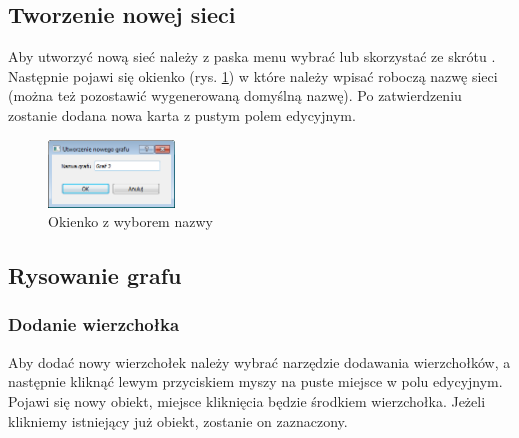 \subsection{Tworzenie nowej sieci}
Aby utworzyć nową sieć należy z paska menu wybrać  lub skorzystać ze skrótu . Następnie pojawi się okienko (rys. \ref{fig:nowyGrafMsgbox}) w które należy wpisać roboczą nazwę sieci (można też pozostawić wygenerowaną domyślną nazwę). Po zatwierdzeniu zostanie dodana nowa karta z pustym polem edycyjnym.
\begin{figure}[H]
	\centering
	\includegraphics[width=0.3\textwidth]{./img/spec_zew02}
	\caption{Okienko z wyborem nazwy}
	\label{fig:nowyGrafMsgbox}
\end{figure}
\subsection{Rysowanie grafu}
\subsubsection{Dodanie wierzchołka}
Aby dodać nowy wierzchołek należy wybrać narzędzie dodawania wierzchołków, a następnie kliknąć lewym przyciskiem myszy na puste miejsce w polu edycyjnym. Pojawi się nowy obiekt, miejsce kliknięcia będzie środkiem wierzchołka. Jeżeli klikniemy istniejący już obiekt, zostanie on zaznaczony.
